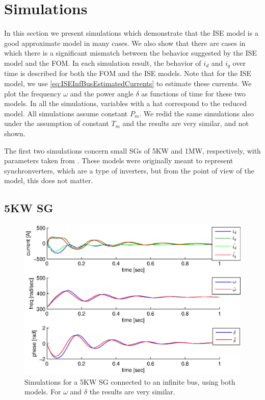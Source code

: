 \documentclass[conference]{IEEEtran}
\renewcommand{\o}    {{\omega}}
\begin{document}
\section{Simulations}

In this section we present simulations which demonstrate that the ISE
model is a good approximate model in many cases. We also show that
there are cases in which there is a significant mismatch between the
behavior suggested by the ISE model and the FOM. In each simulation
result, the behavior of $i_d$ and $i_q$ over time is described for
both the FOM and the ISE models. Note that for the ISE model, we use
\eqref{eq:ISEInfBusEstimatedCurrents} to estimate these currents. We
plot the frequency $\o$ and the power angle $\delta$ as functions of
time for these two models. In all the simulations, variables with a
hat correspond to the reduced model. All simulations assume constant
$P_m$. We redid the same simulations also under the assumption of
constant $T_m$ and the results are very similar, and not shown.

The first two simulations concern small SGs of 5KW and 1MW,
respectively, with parameters taken from \cite{Eitan}. These models
were originally meant to represent synchronverters, which are a type
of inverters, but from the point of view of the model, this does not
matter.

\subsection{5KW SG}
\vspace{-5mm}

\begin{figure}[ht] 
\includegraphics[scale=0.6]{sim5KWInfBus}
\caption{Simulations for a 5KW SG connected to an infinite bus,
using both models. For $\o$ and $\delta$ the results are very 
similar.} \label{fig:InfBusOne5KWSG}
\end{figure}
\end{document}
